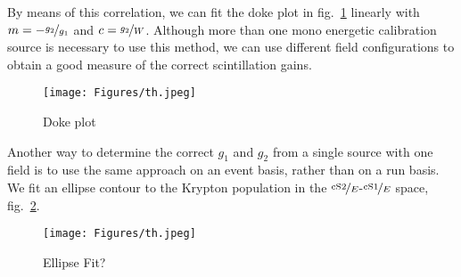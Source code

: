 By means of this correlation, we can fit the doke plot in fig.~\ref{fig:doke} linearly with $ m = - \nicefrac{g_2}{g_1} $ and $ c = \nicefrac{g_2}{W} $.  %
Although more than one mono energetic calibration source is necessary to use this method, we can use different field configurations to obtain a good measure of the correct scintillation gains.

\begin{figure}
\centering
\texttt{[image: Figures/th.jpeg]}  %
\caption[Doke plot]{
    Doke plot
    }
\label{fig:doke}
\end{figure}

Another way to determine the correct $ g_1 $ and $ g_2 $ from a single source with one field is to use the same approach on an event basis, rather than on a run basis.
We fit an ellipse contour to the Krypton population in the $ \nicefrac{\mathrm{cS2}}{E} $-$ \nicefrac{\mathrm{cS1}}{E} $ space, fig.~\ref{fig:elipse}.

\begin{figure}
\centering
\texttt{[image: Figures/th.jpeg]}  %
\caption[Ellipse Fit]{
        Ellipse Fit?
    }
\label{fig:elipse}
\end{figure}




